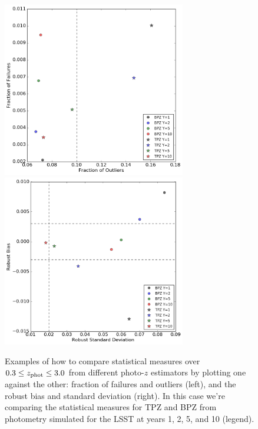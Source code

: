 \documentclass[DM,lsstdraft,toc]{lsstdoc}
\begin{document}
\begin{figure}
\begin{center}
\includegraphics[width=8cm]{figures/stat_stat_fout_ffail.png}
\includegraphics[width=8cm]{figures/stat_stat_std_bias.png}
\caption{Examples of how to compare statistical measures over $0.3 \leq z_{\rm phot} \leq 3.0$ from different photo-$z$ estimators by plotting one against the other: fraction of failures and outliers (left), and the robust bias and standard deviation (right). In this case we're comparing the statistical measures for TPZ and BPZ from photometry simulated for the LSST at years 1, 2, 5, and 10 (legend).  \label{fig:stat_stat}}
\end{center}
\end{figure}
\end{document}

